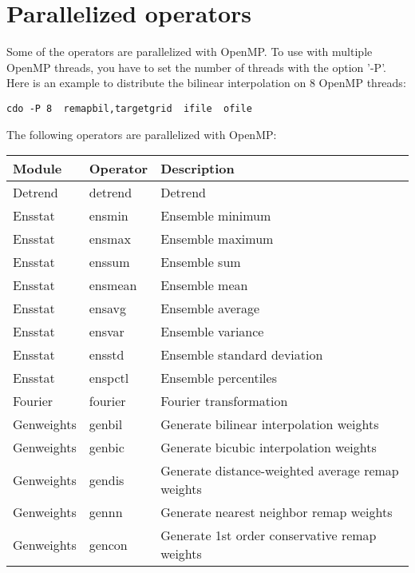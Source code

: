 \chapter{\label{openmp}Parallelized operators}

Some of the {\CDO} operators are parallelized with OpenMP.
To use {\CDO} with multiple OpenMP threads, you have to set the number of threads with the option '-P'.
Here is an example to distribute the bilinear interpolation on 8 OpenMP threads:
\begin{lstlisting}[frame=single, backgroundcolor=\color{pcolor2}, basicstyle=\ttfamily, columns=flexible]
   cdo -P 8  remapbil,targetgrid  ifile  ofile
\end{lstlisting}
The following {\CDO} operators are parallelized with OpenMP:

\begin{tabular}[t]{|l|>{\columncolor{pcolor1}}l|l|}
\hline
\rowcolor{pcolor2}
{\bf Module}     &  {\bf Operator} & {\bf Description} \\ \hline
Detrend      & detrend         & Detrend \\ \hline
Ensstat      & ensmin          & Ensemble minimum \\ \hline
Ensstat      & ensmax          & Ensemble maximum \\ \hline
Ensstat      & enssum          & Ensemble sum \\ \hline
Ensstat      & ensmean         & Ensemble mean \\ \hline
Ensstat      & ensavg          & Ensemble average \\ \hline
Ensstat      & ensvar          & Ensemble variance \\ \hline
Ensstat      & ensstd          & Ensemble standard deviation \\ \hline
Ensstat      & enspctl         & Ensemble percentiles \\ \hline
Fourier      & fourier         & Fourier transformation \\ \hline
Genweights   & genbil          & Generate bilinear interpolation weights \\ \hline
Genweights   & genbic          & Generate bicubic interpolation weights \\ \hline
Genweights   & gendis          & Generate distance-weighted average remap weights \\ \hline
Genweights   & gennn           & Generate nearest neighbor remap weights \\ \hline
Genweights   & gencon          & Generate 1st order conservative remap weights \\ \hline

\end{tabular}
